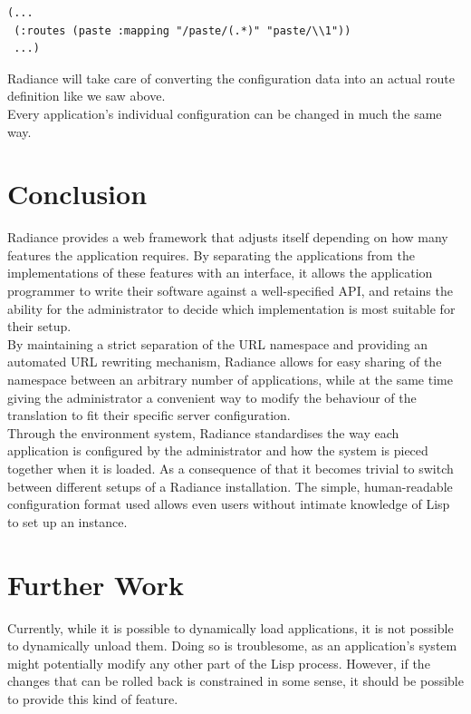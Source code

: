 \documentclass{sig-alternate}
\begin{document}
\begin{verbatim}
(...
 (:routes (paste :mapping "/paste/(.*)" "paste/\\1"))
 ...)
\end{verbatim}

Radiance will take care of converting the configuration data into an actual route definition like we saw above. \\

Every application's individual configuration can be changed in much the same way.

\section{Conclusion}
Radiance provides a web framework that adjusts itself depending on how many features the application requires. By separating the applications from the implementations of these features with an interface, it allows the application programmer to write their software against a well-specified API, and retains the ability for the administrator to decide which implementation is most suitable for their setup. \\

By maintaining a strict separation of the URL namespace and providing an automated URL rewriting mechanism, Radiance allows for easy sharing of the namespace between an arbitrary number of applications, while at the same time giving the administrator a convenient way to modify the behaviour of the translation to fit their specific server configuration. \\

Through the environment system, Radiance standardises the way each application is configured by the administrator and how the system is pieced together when it is loaded. As a consequence of that it becomes trivial to switch between different setups of a Radiance installation. The simple, human-readable configuration format used allows even users without intimate knowledge of Lisp to set up an instance.

\section{Further Work}
Currently, while it is possible to dynamically load applications, it is not possible to dynamically unload them. Doing so is troublesome, as an application's system might potentially modify any other part of the Lisp process. However, if the changes that can be rolled back is constrained in some sense, it should be possible to provide this kind of feature. \\
\end{document}
